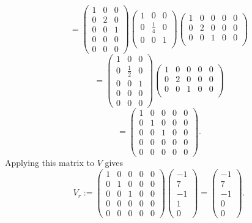 \documentclass[12pt]{article}
\def\bv{\left(\begin{array}{c}}
\def\ev{\end{array}\right) }
\begin{document}
$$= 
\left( \begin{array}{rrr}
1 &0&0\\
0      &2&0\\
0&0&1\\
0&0&0\\
0&0&0
\end{array} \right)
\left( \begin{array}{rrr}
1 &0&0\\
0      &\frac14&0\\
0&0&1\\
\end{array} \right)
\left( \begin{array}{rrrrr}
1 &0&0&0&0\\
0      &2&0&0&0\\
0&0&1&0&0\\
\end{array} \right)
$$
$$= 
\left( \begin{array}{rrr}
1 &0&0\\
0      &\frac12&0\\
0&0&1\\
0&0&0\\
0&0&0
\end{array} \right)
\left( \begin{array}{rrrrr}
1 &0&0&0&0\\
0      &2&0&0&0\\
0&0&1&0&0\\
\end{array} \right)
$$
$$= 
\left( \begin{array}{rrrrr}
1 &0&0&0&0\\
0      &1&0&0&0\\
0&0&1&0&0\\
0&0&0&0&0\\
0&0&0&0&0
\end{array} \right).
$$
Applying this matrix to $V$ gives 
$$
V_r:=\left( \begin{array}{rrrrr}
1 &0&0&0&0\\
0      &1&0&0&0\\
0&0&1&0&0\\
0&0&0&0&0\\
0&0&0&0&0
\end{array} \right) 
\bv -1\\7\\-1\\1\\0 \ev 
=
\bv -1\\7\\-1\\0\\0 \ev.
$$
\end{document}
